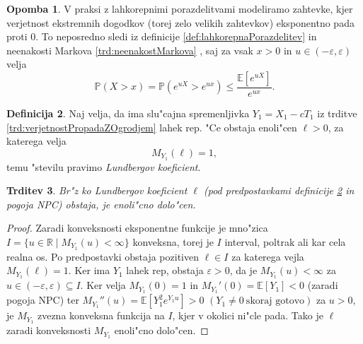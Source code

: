 \documentclass[12pt, a4paper, reqno]{amsart}
\theoremstyle{definition}
\newtheorem{definicija}{Definicija}[section]
\newtheorem{opomba}[definicija]{Opomba}
\theoremstyle{plain}
\newtheorem{trditev}[definicija]{Trditev}
\newcommand{\R}{\mathbb{R}}
\newcommand{\E}{\mathbb{E}}
\newcommand{\Prob}{\mathbb{P}}
\newcommand{\1}{\mathds{1}}
\newcommand*{\refPriloga}[1]{%
  \begingroup
    \hypersetup{
      linkcolor=red,
      linkbordercolor=red,
    }%
    \ref{#1}%
  \endgroup
}
\begin{document}
            \begin{opomba}
                V praksi z lahkorepnimi porazdelitvami modeliramo zahtevke, kjer verjetnost ekstremnih 
                dogodkov (torej zelo velikih zahtevkov) eksponentno pada proti $0$. To neposredno sledi iz 
                definicije \ref{def:lahkorepnaPorazdelitev} in neenakosti Markova \refPriloga{trd:neenakostMarkova}, 
                saj za vsak 
                $x>0$ in $u\in(-\varepsilon, \varepsilon)$ velja
                \begin{equation*}
                    \Prob\left(X > x\right) = \Prob\left(e^{uX} > e^{ux}\right) \leq \frac{\E\left[e^{uX}\right]}{e^{ux}}.
                \end{equation*}
                \label{op:lahkorepnaPorazdelitev}
            \end{opomba}

            \begin{definicija}
                Naj velja, da ima slu"cajna spremenljivka $Y_1 = X_1 - cT_1$ iz trditve \ref{trd:verjetnostPropadaZOgrodjem} 
                lahek rep. "Ce obstaja enoli"cen $\ell > 0$, za katerega velja
                \begin{equation*}
                    M_{Y_1}(\ell)  = 1,
                \end{equation*}
                temu "stevilu pravimo \textit{Lundbergov koeficient}.
                \label{def:LundbergovKoeficient}
            \end{definicija}

            \begin{trditev}
                Br"z ko Lundbergov koeficient $\ell$ (pod predpostavkami definicije \ref{def:LundbergovKoeficient} in 
                pogoja NPC)
                obstaja, je enoli"cno dolo"cen.
                \label{trd:enolicnostLundbergovegaKoeficienta}
            \end{trditev}

            \begin{proof}
                Zaradi konveksnosti eksponentne funkcije je mno"zica $I = \{u\in\R \mid M_{Y_1}(u) < \infty\}$ konveksna, 
                torej je $I$ interval, poltrak ali kar cela realna os. Po predpostavki obstaja pozitiven $\ell \in I$ za 
                katerega vejla $M_{Y_1}(\ell) = 1$.
                Ker ima $Y_1$ lahek rep, obstaja $\varepsilon > 0$, da je $M_{Y_1}(u) < \infty$ za $u\in(-\varepsilon, \varepsilon)\subseteq I$.
                Ker velja $M_{Y_1}(0) = 1$ in $M_{Y_1}'(0) = \E\left[Y_1\right] < 0$ (zaradi pogoja NPC) ter
                $M_{Y_1}''(u) = \E\left[Y_1^2e^{Y_1u}\right] > 0$ $(Y_1 \neq 0 \ \text{skoraj gotovo})$ za 
                $u>0$, je $M_{Y_1}$ zvezna konveksna funkcija na $I$, kjer 
                v okolici ni"cle pada. Tako je $\ell$ zaradi konveksnosti $M_{Y_1}$ enoli"cno dolo"cen.
            \end{proof}
\end{document}

